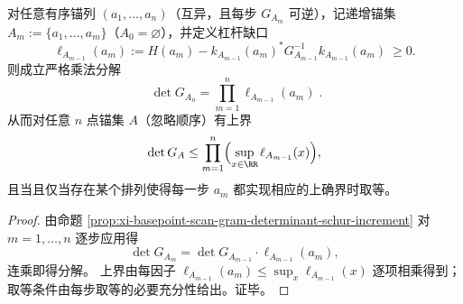 \begin{corollary}\label{cor:xi-basepoint-scan-gram-determinant-leverage-product}
对任意有序锚列 \((a_1,\dots,a_n)\)（互异，且每步 \(G_{A_m}\) 可逆），记递增锚集 \(A_m:=\{a_1,\dots,a_m\}\)（\(A_0=\varnothing\)），并定义杠杆缺口
\[
\ell_{A_{m-1}}(a_m):=
H(a_m)-k_{A_{m-1}}(a_m)^\ast G_{A_{m-1}}^{-1}k_{A_{m-1}}(a_m)\ \ge 0.
\]
则成立严格乘法分解
\[
\boxed{\;
\det G_{A_n}=\prod_{m=1}^{n}\ell_{A_{m-1}}(a_m)\; }.
\]
从而对任意 \(n\) 点锚集 \(A\)（忽略顺序）有上界
\[
\det G_A\le \prod_{m=1}^{n}\Bigl(\sup_{x\in\RR}\ell_{A_{m-1}}(x)\Bigr),
\]
且当且仅当存在某个排列使得每一步 \(a_m\) 都实现相应的上确界时取等。
\end{corollary}
\begin{proof}
由命题 \ref{prop:xi-basepoint-scan-gram-determinant-schur-increment} 对 \(m=1,\dots,n\) 逐步应用得
\[
\det G_{A_m}=\det G_{A_{m-1}}\cdot \ell_{A_{m-1}}(a_m),
\]
连乘即得分解。
上界由每因子 \(\ell_{A_{m-1}}(a_m)\le \sup_x\ell_{A_{m-1}}(x)\) 逐项相乘得到；
取等条件由每步取等的必要充分性给出。证毕。
\end{proof}

